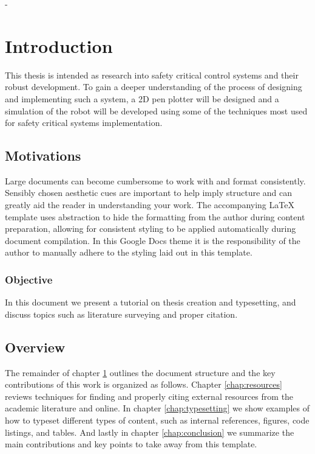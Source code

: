 -\chapter{Introduction}
	\label{chap:intro}
	
	This thesis is intended as research into safety critical control systems and their robust development. To gain a deeper understanding of the process of designing and implementing such a system, a 2D pen plotter will be designed and a simulation of the robot will be developed using some of the techniques most used for safety critical systems implementation.
	
	\section{Motivations}
		\label{sec:intro_motivation} 
		
		Large documents can become cumbersome to work with and format consistently. Sensibly chosen aesthetic cues are important to help imply structure and can greatly aid the reader in understanding your work. The accompanying LaTeX template uses abstraction to hide the formatting from the author during content preparation, allowing for consistent styling to be applied automatically during document compilation. In this Google Docs theme it is the responsibility of the author to manually adhere to the styling laid out in this template.
	
	\subsection{Objective}
		\label{sec:intro_objective} 
		
		In this document we present a tutorial on thesis creation and typesetting, and discuss topics such as literature surveying and proper citation. 
		
	\section{Overview}  
		\label{sec:intro_overview} 
		
		The remainder of chapter \ref{chap:intro} outlines the document structure and the key contributions of this work is organized as follows. Chapter \ref{chap:resources} reviews techniques for finding and properly citing external resources from the academic literature and online. In chapter \ref{chap:typesetting} we show examples of how to typeset different types of content, such as internal references, figures, code listings, and tables. And lastly in chapter \ref{chap:conclusion} we summarize the main contributions and key points to take away from this template.
	
